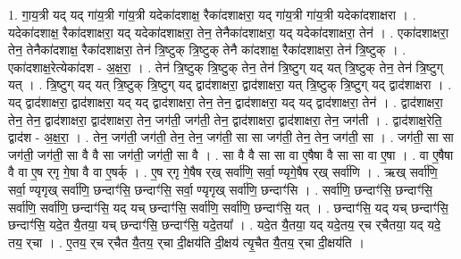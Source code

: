 \documentclass[17pt]{extarticle}
\begin{document}
1. गा॒य॒त्री यद् यद् गा॑य॒त्री गा॑य॒त्री यदेका॑दशाक्ष॒ रैका॑दशाक्षरा॒ यद् गा॑य॒त्री गा॑य॒त्री यदेका॑दशाक्षरा । . यदेका॑दशाक्ष॒ रैका॑दशाक्षरा॒ यद् यदेका॑दशाक्षरा॒ तेन॒ तेनैका॑दशाक्षरा॒ यद् यदेका॑दशाक्षरा॒ तेन॑ । . एका॑दशाक्षरा॒ तेन॒ तेनैका॑दशाक्ष॒ रैका॑दशाक्षरा॒ तेन॑ त्रि॒ष्टुक् त्रि॒ष्टुक् तेनै का॑दशाक्ष॒
रैका॑दशाक्षरा॒ तेन॑ त्रि॒ष्टुक् । . एका॑दशाक्ष॒रेत्येका॑दश - अ॒क्ष॒रा॒ । . तेन॑ त्रि॒ष्टुक् त्रि॒ष्टुक् तेन॒ तेन॑ त्रि॒ष्टुग् यद् यत् त्रि॒ष्टुक् तेन॒ तेन॑ त्रि॒ष्टुग् यत् । . त्रि॒ष्टुग् यद् यत् त्रि॒ष्टुक् त्रि॒ष्टुग् यद् द्वाद॑शाक्षरा॒ द्वाद॑शाक्षरा॒ यत् त्रि॒ष्टुक् त्रि॒ष्टुग् यद् द्वाद॑शाक्षरा । . यद् द्वाद॑शाक्षरा॒ द्वाद॑शाक्षरा॒ यद् यद् द्वाद॑शाक्षरा॒ तेन॒ तेन॒ द्वाद॑शाक्षरा॒ यद् यद् द्वाद॑शाक्षरा॒ तेन॑ । . द्वाद॑शाक्षरा॒ तेन॒ तेन॒ द्वाद॑शाक्षरा॒ द्वाद॑शाक्षरा॒ तेन॒ जग॑ती॒ जग॑ती॒ तेन॒ द्वाद॑शाक्षरा॒ द्वाद॑शाक्षरा॒ तेन॒ जग॑ती । . द्वाद॑शाक्ष॒रेति॒ द्वाद॑श - अ॒क्ष॒रा॒ । . तेन॒ जग॑ती॒ जग॑ती॒ तेन॒ तेन॒ जग॑ती॒ सा सा जग॑ती॒ तेन॒ तेन॒ जग॑ती॒ सा । . जग॑ती॒ सा सा जग॑ती॒ जग॑ती॒ सा वै वै सा जग॑ती॒ जग॑ती॒ सा वै । . सा वै वै सा सा वा ए॒षैषा वै सा सा वा ए॒षा । . वा ए॒षैषा वै वा ए॒ष र्‌गृ गे॒षा वै वा ए॒षर्क् । . ए॒ष र्‌गृ गे॒षैष र्‌ख् सर्वा॑णि॒ सर्वा॒ ण्यृगे॒षैष र्‌ख् सर्वा॑णि । . ऋख् सर्वा॑णि॒ सर्वा॒ ण्यृगृख् सर्वा॑णि॒ छन्दाꣳ॑सि॒ छन्दाꣳ॑सि॒ सर्वा॒ ण्यृगृख् सर्वा॑णि॒ छन्दाꣳ॑सि । . सर्वा॑णि॒ छन्दाꣳ॑सि॒ छन्दाꣳ॑सि॒ सर्वा॑णि॒ सर्वा॑णि॒ छन्दाꣳ॑सि॒ यद् यच् छन्दाꣳ॑सि॒ सर्वा॑णि॒ सर्वा॑णि॒ छन्दाꣳ॑सि॒ यत् । . छन्दाꣳ॑सि॒ यद् यच् छन्दाꣳ॑सि॒ छन्दाꣳ॑सि॒ यदे॒त यै॒तया॒ यच् छन्दाꣳ॑सि॒ छन्दाꣳ॑सि॒ यदे॒तया᳚ । . यदे॒त यै॒तया॒ यद् यदे॒तय॒ र्‌च र्‌चैतया॒ यद् यदे॒ तय॒ र्‌चा । . ए॒तय॒ र्‌च र्‌चैत यै॒तय॒ र्‌चा दी॒क्षय॑ति दी॒क्षय॑ त्यृ॒चैत यै॒तय॒ र्‌चा दी॒क्षय॑ति । \newline
\end{document}
